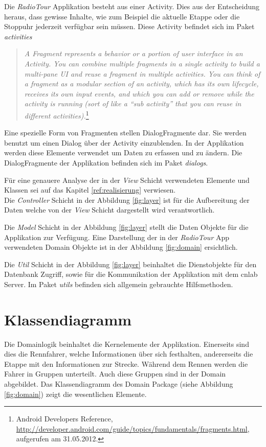 Die \textit{RadioTour} Applikation besteht aus einer Activity. Dies aus der Entscheidung heraus, dass gewisse Inhalte, wie zum Beispiel die aktuelle Etappe oder die Stoppuhr jederzeit verfügbar sein müssen. Diese Activity befindet sich im Paket \textit{activities}

\begin{quote}
\textit{A Fragment represents a behavior or a portion of user interface in an Activity. You can combine multiple fragments in a single activity to build a multi-pane UI and reuse a fragment in multiple activities. You can think of a fragment as a modular section of an activity, which has its own lifecycle, receives its own input events, and which you can add or remove while the activity is running (sort of like a "`sub activity"' that you can reuse in different activities).}\footnote{Android Developers Reference, \url{http://developer.android.com/guide/topics/fundamentals/fragments.html}, aufgerufen am 31.05.2012.}
\end{quote}

Eine spezielle Form von Fragmenten stellen DialogFragmente dar. Sie werden benutzt um einen Dialog über der Activity einzublenden. In der Applikation werden diese Elemente verwendet um Daten zu erfassen und zu ändern. Die DialogFragmente der Applikation befinden sich im Paket \textit{dialogs}.

Für eine genauere Analyse der in der \textit{View} Schicht verwendeten Elemente und Klassen sei auf das Kapitel \ref{ref:realisierung} verwiesen.
\\
Die \textit{Controller} Schicht in der Abbildung \ref{fig:layer} ist für die Aufbereitung der Daten welche von der \textit{View} Schicht dargestellt wird verantwortlich.

Die \textit{Model} Schicht in der Abbildung \ref{fig:layer} stellt die Daten Objekte für die Applikation zur Verfügung. Eine Darstellung der in der \textit{RadioTour} App  verwendeten Domain Objekte ist in der Abbildung \ref{fig:domain} ersichtlich.

Die \textit{Util} Schicht in der Abbildung \ref{fig:layer} beinhaltet die Dienstobjekte für den Datenbank Zugriff, sowie für die Kommunikation der Applikation mit dem cnlab Server. Im Paket \textit{utils} befinden sich allgemein gebrauchte Hilfsmethoden.


\section{Klassendiagramm}
Die Domainlogik beinhaltet die Kernelemente der Applikation. Einerseits sind dies die Rennfahrer, welche Informationen über sich festhalten, andererseits die Etappe mit den Informationen zur Strecke. Während dem Rennen werden die Fahrer in Gruppen unterteilt. Auch diese Gruppen sind in der Domain abgebildet. Das Klassendiagramm des Domain Package (siehe Abbildung \ref{fig:domain}) zeigt die wesentlichen Elemente.

